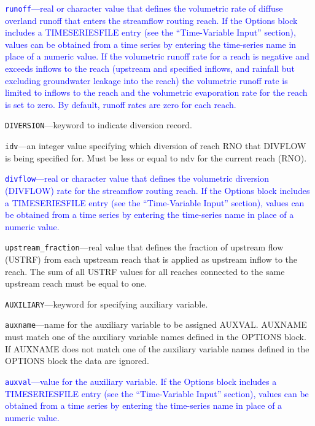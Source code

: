 \begin{description}
\item \textcolor{blue}{\texttt{runoff}---real or character value that defines the volumetric rate of diffuse overland runoff that enters the streamflow routing reach. If the Options block includes a TIMESERIESFILE entry (see the ``Time-Variable Input'' section), values can be obtained from a time series by entering the time-series name in place of a numeric value. If the volumetric runoff rate for a reach is negative and exceeds inflows to the reach (upstream and specified inflows, and rainfall but excluding groundwater leakage into the reach) the volumetric runoff rate is limited to inflows to the reach and the volumetric evaporation rate for the reach is set to zero. By default, runoff rates are zero for each reach.}

\item \texttt{DIVERSION}---keyword to indicate diversion record.

\item \texttt{idv}---an integer value specifying which diversion of reach RNO that DIVFLOW is being specified for.  Must be less or equal to ndv for the current reach (RNO).

\item \textcolor{blue}{\texttt{divflow}---real or character value that defines the volumetric diversion (DIVFLOW) rate for the streamflow routing reach. If the Options block includes a TIMESERIESFILE entry (see the ``Time-Variable Input'' section), values can be obtained from a time series by entering the time-series name in place of a numeric value.}

\item \texttt{upstream\_fraction}---real value that defines the fraction of upstream flow (USTRF) from each upstream reach that is applied as upstream inflow to the reach. The sum of all USTRF values for all reaches connected to the same upstream reach must be equal to one.

\item \texttt{AUXILIARY}---keyword for specifying auxiliary variable.

\item \texttt{auxname}---name for the auxiliary variable to be assigned AUXVAL.  AUXNAME must match one of the auxiliary variable names defined in the OPTIONS block. If AUXNAME does not match one of the auxiliary variable names defined in the OPTIONS block the data are ignored.

\item \textcolor{blue}{\texttt{auxval}---value for the auxiliary variable.  If the Options block includes a TIMESERIESFILE entry (see the ``Time-Variable Input'' section), values can be obtained from a time series by entering the time-series name in place of a numeric value.}

\end{description}

